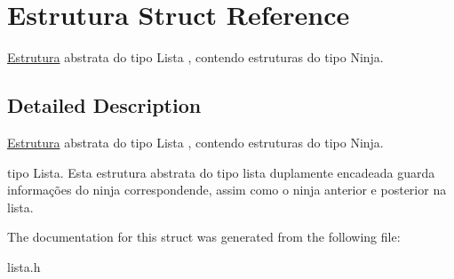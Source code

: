 \hypertarget{structEstrutura}{}\section{Estrutura Struct Reference}
\label{structEstrutura}


\mbox{\hyperlink{structEstrutura}{Estrutura}} abstrata do tipo Lista , contendo estruturas do tipo Ninja.  




\subsection{Detailed Description}
\mbox{\hyperlink{structEstrutura}{Estrutura}} abstrata do tipo Lista , contendo estruturas do tipo Ninja. 

tipo Lista. Esta estrutura abstrata do tipo lista duplamente encadeada guarda informações do ninja correspondende, assim como o ninja anterior e posterior na lista. 

The documentation for this struct was generated from the following file\+:\begin{DoxyCompactItemize}
\item 
lista.\+h\end{DoxyCompactItemize}
